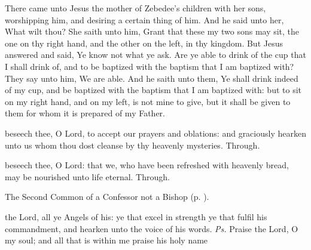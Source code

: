 
 There came unto Jesus the mother of Zebedee's children with her sons, worshipping him, and desiring a certain thing of him. And he said unto her, What wilt thou? She saith unto him, Grant that these my two sons may sit, the one on thy right hand, and the other on the left, in thy kingdom. But Jesus answered and said, Ye know not what ye ask. Are ye able to drink of the cup that I shall drink of, and to be baptized with the baptism that I am baptized with? They say unto him, We are able. And he saith unto them, Ye shall drink indeed of my cup, and be baptized with the baptism that I am baptized with: but to sit on my right hand, and on my left, is not mine to give, but it shall be given to them for whom it is prepared of my Father.


\secret
{} beseech thee, O Lord, to accept our prayers and oblations: and graciously hearken unto us whom thou dost cleanse by thy heavenly mysteries. Through.


\postcommunion
{} beseech thee, O Lord: that we, who have been refreshed with heavenly bread, may be nourished unto life eternal. Through.




\begin{rubric}
	The Second Common of a Confessor not a Bishop (p. \pageref{CommonConfessorNotBishopII}).
\end{rubric}



\introit
{} the Lord, all ye Angels of his: ye that excel in strength ye that fulfil his commandment, and hearken unto the voice of his words. \textit{Ps.} Praise the Lord, O my soul; and all that is within me praise his holy name

